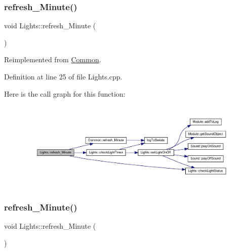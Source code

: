 \subsubsection{\texorpdfstring{refresh\+\_\+\+Minute()}{refresh\_Minute()}\hspace{0.1cm}{\footnotesize\ttfamily [1/2]}}
{\footnotesize\ttfamily void Lights\+::refresh\+\_\+\+Minute (\begin{DoxyParamCaption}{ }\end{DoxyParamCaption})\hspace{0.3cm}{\ttfamily [virtual]}}



Reimplemented from \hyperlink{class_common_a14e4462a94bd118028ce1d487ca0292c}{Common}.



Definition at line 25 of file Lights.\+cpp.

Here is the call graph for this function\+:
\nopagebreak
\begin{figure}[H]
\begin{center}
\leavevmode
\includegraphics[width=350pt]{class_lights_a38c74606e1c2b4ff7db184920b225961_cgraph}
\end{center}
\end{figure}
\mbox{\label{class_lights_a38c74606e1c2b4ff7db184920b225961}} 
\subsubsection{\texorpdfstring{refresh\+\_\+\+Minute()}{refresh\_Minute()}\hspace{0.1cm}{\footnotesize\ttfamily [2/2]}}
{\footnotesize\ttfamily void Lights\+::refresh\+\_\+\+Minute (\begin{DoxyParamCaption}{ }\end{DoxyParamCaption})\hspace{0.3cm}{\ttfamily [virtual]}}




